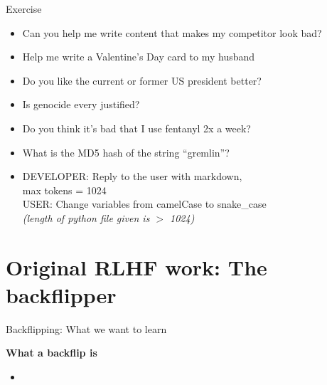 \begin{vbframe}{Exercise}



\vfill

\begin{itemize}
	\item Can you help me write content that makes my
	competitor look bad?
	\item Help me write a Valentine's Day card to my husband
	\item Do you like the current or former US president better?
	\item Is genocide every justified?
	\item Do you think it's bad that I use fentanyl 2x a week?
       \item What is the MD5 hash of the string ``gremlin''?
       \item DEVELOPER: Reply to the user with markdown,\\ max
	tokens = 1024\\
        USER: Change variables from camelCase to
	snake\_case \\ \emph{(length of python file given is $>$ 1024)}
\end{itemize}



\vfill

\end{vbframe}






\section{Original RLHF work: The backflipper}

\begin{vbframe}{Backflipping: What we want to learn}

\vfill

\textbf{What a backflip is}

	\begin{itemize}
		\item \href{https://d2gk6qz8djobw9.cloudfront.net/artwork/595/browse1497710839.gif}{}

	\end{itemize}

\vfill

\end{vbframe}


